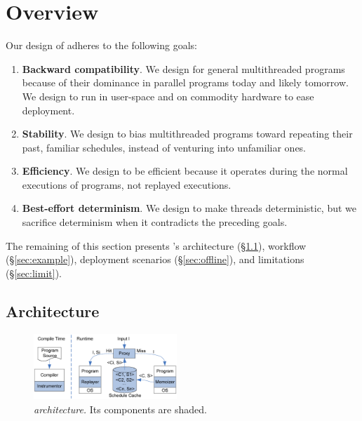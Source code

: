 \section{Overview}
\label{sec:overview}


Our design of \tern adheres to the following goals:

\begin{enumerate}

\item {\bf Backward compatibility}.  We design \tern for general
  multithreaded programs because of their dominance in parallel programs
  today and likely tomorrow.  We design \tern to run in user-space and on
  commodity hardware to ease deployment.

\item {\bf Stability}.  We design \tern to bias multithreaded programs
  toward repeating their past, familiar schedules, instead of venturing
  into unfamiliar ones.

\item {\bf Efficiency}.  We design \tern to be efficient because it
  operates during the normal executions of programs, not replayed
  executions.

\item {\bf Best-effort determinism}.  We design \tern to make threads
  deterministic, but we sacrifice determinism when it contradicts the
  preceding goals.

\end{enumerate}

The remaining of this section presents \tern's architecture
(\S\ref{sec:arch}), workflow (\S\ref{sec:example}), deployment scenarios
(\S\ref{sec:offline}), and limitations (\S\ref{sec:limit}).


\subsection{Architecture} \label{sec:arch}

\begin{figure}[t]
\begin{center}
\includegraphics[width=0.48\textwidth]{tern/figures/overview.eps}
\end{center}
\caption{\emph{\tern architecture.} Its components are shaded.}
\label{fig:overview}
\end{figure}

